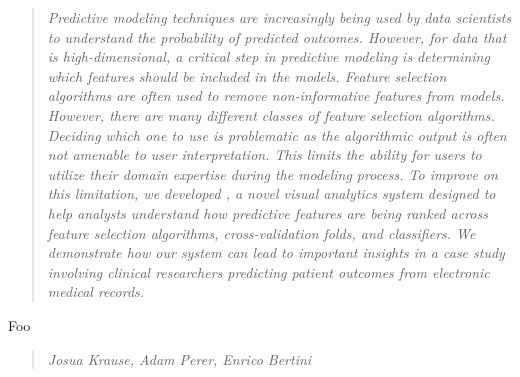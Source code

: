 \begin{quote}
\textit{Predictive modeling techniques are increasingly being used by
data scientists to understand the probability of predicted outcomes.
However, for data that is high-dimensional, a critical step in predictive
modeling is determining which features should be included in the models.
Feature selection algorithms are often used to
remove non-informative features from models.
However, there are many different classes of feature selection algorithms.
Deciding which one to use is problematic as the algorithmic output
is often not amenable to user interpretation.
This limits the ability for users to utilize their
domain expertise during the modeling process.
To improve on this limitation, we developed \infuse ,
a novel visual analytics system designed to help analysts
understand how predictive features are being ranked across
feature selection algorithms, cross-validation folds, and classifiers.
We demonstrate how our system can lead to important insights
in a case study involving clinical researchers predicting patient
outcomes from electronic medical records.
}\end{quote}

\begin{contributions}{Foo}
\item {}
\end{contributions}

\begin{quote}
\textit{Josua Krause, Adam Perer, Enrico Bertini}
\end{quote}